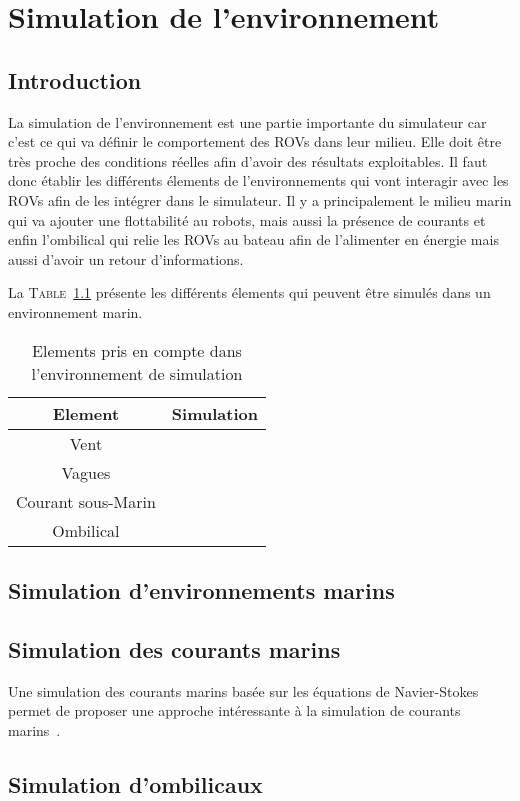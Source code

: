 \chapter{Simulation de l'environnement}
\label{chapitre:environnement}
	
	\section{Introduction}

		La simulation de l'environnement est une partie importante du simulateur car c'est ce qui va définir le comportement des \gls{ROV}s dans leur milieu. Elle doit être très proche des conditions réelles afin d'avoir des résultats exploitables. Il faut donc établir les différents élements de l'environnements qui vont interagir avec les \gls{ROV}s afin de les intégrer dans le simulateur. Il y a principalement le milieu marin qui va ajouter une flottabilité au robots, mais aussi la présence de courants et enfin l'ombilical qui relie les \gls{ROV}s au bateau afin de l'alimenter en énergie mais aussi d'avoir un retour d'informations.

		La \textsc{Table}~\ref{table:elements} présente les différents élements qui peuvent être simulés dans un environnement marin.

		\begin{table}[ht]
			\centering
			\begin{tabular}{|c|c|}
				\hline
				Element & Simulation \\
				\hline
				Vent & \xmark\\
				\hline
				Vagues & \xmark\\
				\hline
				Courant sous-Marin & \cmark \\
				\hline
				Ombilical & \cmark \\
				\hline
			\end{tabular}
			\caption{Elements pris en compte dans l'environnement de simulation}
			\label{table:elements}
		\end{table}

	\section{Simulation d'environnements marins}

		

	\section{Simulation des courants marins}

		Une simulation des courants marins basée sur les équations de Navier-Stokes permet de proposer une approche intéressante à la simulation de courants marins~\cite{Garau2006current}.

	\section{Simulation d'ombilicaux}

		
	